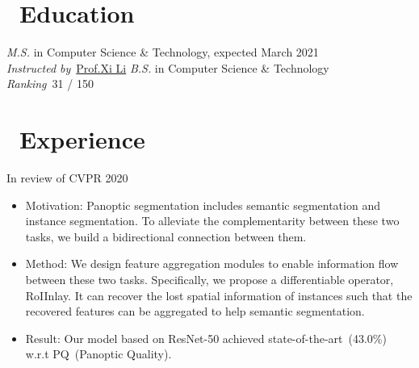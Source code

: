 \documentclass{resume}
\begin{document}

\section{\faGraduationCap\ Education}
\textit{M.S.} in  Computer Science \& Technology, expected March 2021\\
\textit{Instructed by}\ \href{https://person.zju.edu.cn/xilics}{Prof.Xi Li}
\textit{B.S.} in Computer Science \& Technology\\
\textit{Ranking}\ 31 / 150

\section{\faUsers\ Experience}
\role{} {In review of CVPR 2020}
\begin{itemize}
	\item Motivation: Panoptic segmentation includes semantic segmentation and instance segmentation. To alleviate the complementarity between these two tasks, we build a bidirectional connection between them. %
	\item Method: We design feature aggregation modules to enable information flow between these two tasks. Specifically, we propose a differentiable operator, RoIInlay. It can recover the lost spatial information of instances such that the recovered features can be aggregated to help semantic segmentation. 
	\item Result: Our model based on ResNet-50 achieved state-of-the-art~(43.0\%) w.r.t PQ~(Panoptic Quality). 
\end{itemize}
\end{document}
